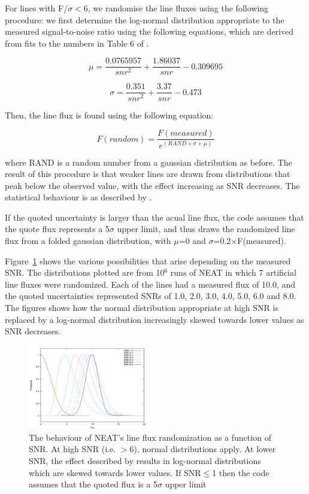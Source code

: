 \documentclass[useAMS,usenatbib]{mn2e}
\begin{document}
For lines with F/$\sigma < $6, we randomise the line fluxes using the following procedure: we first determine the log-normal distribution appropriate to the measured signal-to-noise ratio using the following equations, which are derived from fits to the numbers in Table 6 of \citet{1994A&A...287..676R}.

\begin{equation}
\mu = \frac{0.0765957}{snr^2} + \frac{1.86037}{snr} - 0.309695
\end{equation}

\begin{equation}
\sigma = \frac{0.351}{snr^2} + \frac{3.37}{snr} - 0.473
\end{equation}

Then, the line flux is found using the following equation:

\begin{equation}
F(random) = \frac{F(measured)}{e^(RAND\times\sigma + \mu)}
\end{equation}

where RAND is a random number from a gaussian distribution as before.  The result of this procedure is that weaker lines are drawn from distributions that peak below the observed value, with the effect increasing as SNR decreases.  The statistical behaviour is as described by \citet{1994A&A...287..676R}.

If the quoted uncertainty is larger than the acual line flux, the code assumes that the quote flux represents a 5$\sigma$ upper limit, and thus draws the randomized line flux from a folded gaussian distribution, with $\mu$=0 and $\sigma$=0.2$\times$F(measured).

Figure~\ref{distributions} shows the various possibilities that arise depending on the measured SNR.  The distributions plotted are from 10$^6$ runs of NEAT in which 7 artificial line fluxes were randomized.  Each of the lines had a measured flux of 10.0, and the quoted uncertainties represented SNRs of 1.0, 2.0, 3.0, 4.0, 5.0, 6.0 and 8.0.  The figures shows how the normal distribution appropriate at high SNR is replaced by a log-normal distribution increasingly skewed towards lower values as SNR decreases.

\begin{figure}
\label{distributions}
\includegraphics[width=0.47\textwidth]{figures/distributions_2.png}
\caption{The behaviour of NEAT's line flux randomization as a function of SNR.  At high SNR (i.e. $>$6), normal distributions apply.  At lower SNR, the effect described by \citet{1994A&A...287..676R} results in log-normal distributions which are skewed towards lower values.  If SNR$\leq$1 then the code assumes that the quoted flux is a 5$\sigma$ upper limit}
\end{figure}
\end{document}

